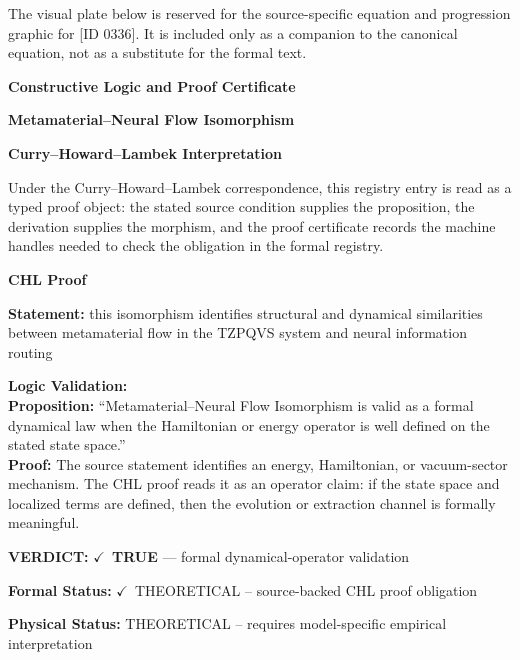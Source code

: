 \begingroup\footnotesize\sloppy
The visual plate below is reserved for the source-specific equation and progression graphic for [ID 0336]. It is included only as a companion to the canonical equation, not as a substitute for the formal text.
\par\endgroup
\ifTZPDarkEdition
{}
\fi

\clearpage
\begingroup\tzpsupportsetup
\noindent\textbf{\fontsize{10.8pt}{12.8pt}\selectfont [ID 0336] Constructive Logic and Proof Certificate}\par
\noindent\textbf{\fontsize{10pt}{12pt}\selectfont Metamaterial--Neural Flow Isomorphism}\par
\vspace{0.45em}
\begingroup
\footnotesize
\setlength{\parskip}{0.22em}
\setlength{\parindent}{0pt}
\noindent\textbf{Curry--Howard--Lambek Interpretation}\par
Under the Curry--Howard--Lambek correspondence, this registry entry is read as a typed proof
object: the stated source condition supplies the proposition, the derivation supplies the
morphism, and the proof certificate records the machine handles needed to check the obligation
in the formal registry.

\vspace{0.45em}
\noindent\textbf{CHL Proof}\par
\textbf{Statement:} this isomorphism identifies structural and dynamical similarities between metamaterial
flow in the TZPQVS system and neural information routing

\textbf{Logic Validation:}\\
\textbf{Proposition:} ``Metamaterial--Neural Flow Isomorphism is valid as a formal dynamical law when the
Hamiltonian or energy operator is well defined on the stated state space.''\\
\textbf{Proof:} The source statement identifies an energy, Hamiltonian, or vacuum-sector mechanism. The
CHL proof reads it as an operator claim: if the state space and localized terms are
defined, then the evolution or extraction channel is formally meaningful.

\textbf{VERDICT:} \ensuremath{\checkmark}\ \textbf{TRUE} --- formal dynamical-operator validation

\textbf{Formal Status:} \ensuremath{\checkmark}\ THEORETICAL -- source-backed CHL proof obligation

\textbf{Physical Status:} THEORETICAL -- requires model-specific empirical interpretation
\par\vspace{0.45em}
\par
\ifTZPDarkEdition
{}
\fi
\endgroup
\endgroup
